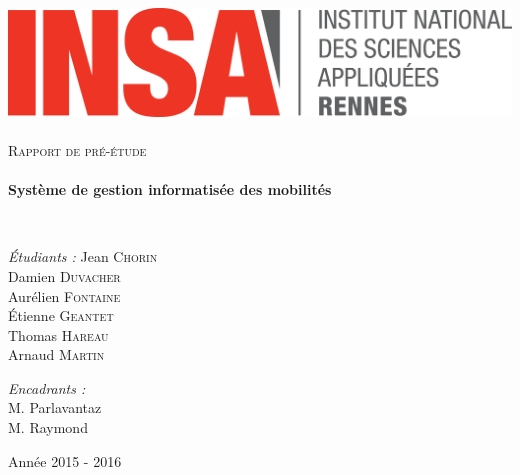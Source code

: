 \begin{titlepage}
		\begin{sffamily}
			\begin{center}
				
				\includegraphics[width=400pt]{logo_INSA.png}~\\[2.5cm]
				
				\textsc{\huge Rapport de pré-étude}\\[2.5cm]
				
				\HRule \\[0.4cm]
				{ \huge \bfseries Système de gestion informatisée des mobilités\\[0.4cm] }
				
				\HRule \\[4cm]
				
				\begin{minipage}{0.4\textwidth}
					\begin{flushleft} \large
						\emph{Étudiants :}
						Jean \textsc{Chorin}\\
						Damien \textsc{Duvacher}\\
						Aurélien \textsc{Fontaine}\\
						Étienne \textsc{Geantet}\\
						Thomas \textsc{Hareau}\\
						Arnaud \textsc{Martin}\\
					\end{flushleft}
				\end{minipage}
				\begin{minipage}{0.5\textwidth}
					\begin{flushright} \large
						\emph{Encadrants :} \\
						M. Parlavantaz\\
						M. Raymond
					\end{flushright}
				\end{minipage}
				
				\vfill
				
				{\large Année 2015 - 2016}
				
			\end{center}
		\end{sffamily}
	\end{titlepage}